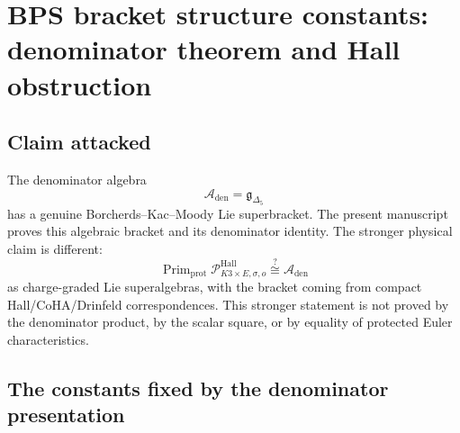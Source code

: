 \section{BPS bracket structure constants: denominator theorem and Hall obstruction}
\label{sec:bps-bracket-structure-constants}

\providecommand{\Z}{\mathbb Z}
\providecommand{\C}{\mathbb C}
\providecommand{\La}{\Lambda}
\providecommand{\autcor}{\mathfrak g_{\Delta_5}}
\providecommand{\smult}{\operatorname{smult}}
\providecommand{\rootmult}{\operatorname{mult}}
\providecommand{\Prim}{\operatorname{Prim}}

\subsection{Claim attacked}

The denominator algebra
$$
\mathcal A_{\mathrm{den}}=\autcor
$$
has a genuine Borcherds--Kac--Moody Lie superbracket.  The present
manuscript proves this algebraic bracket and its denominator identity.
The stronger physical claim is different:
$$
\Prim_{\mathrm{prot}}\mathcal P^{\mathrm{Hall}}_{K3\times E,\sigma,o}
\stackrel{?}{\cong}
\mathcal A_{\mathrm{den}}
$$
as charge-graded Lie superalgebras, with the bracket coming from compact
Hall/CoHA/Drinfeld correspondences.  This stronger statement is not
proved by the denominator product, by the scalar square, or by equality
of protected Euler characteristics.

\subsection{The constants fixed by the denominator presentation}

